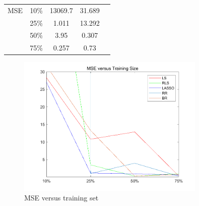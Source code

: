 \documentclass{article}
\begin{document}
\begin{table}[H]
\begin{tabular}{|c|c|c|c|c}
    MSE & 10\%                                                    & 13069.7                & 31.689                                                                       &                                                                                                       \\ \cline{1-4}
        & 25\%                                                    & 1.011                  & 13.292                                                                       &                                                                                                       \\ \cline{1-4}
        & 50\%                                                    & 3.95                   & 0.307                                                                        &                                                                                                       \\ \cline{1-4}
        & 75\%                                                    & 0.257                  & 0.73                                                                         &                                                                                                       \\ \cline{1-4}
    \end{tabular}
    \end{table}

\begin{figure}[H]
    \centering
    \includegraphics[width=0.8\textwidth]{fig/1c-error.png} 
    \caption{MSE versus training set}
\end{figure}
\end{document}
